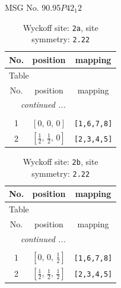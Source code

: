 \documentclass[fleqn,8pt]{jsarticle}
\begin{document}
\setcounter{MaxMatrixCols}{32}

\renewcommand{\tablename}{Table~}
\renewcommand{\figurename}{Figure~}
\begin{center}
\LARGE
MSG No. 90.95\quad$P42_{1}2$
\end{center}
\renewcommand{\arraystretch}{1.2}
\begin{longtable}{ccc}
\caption{Wyckoff site: {\tt 2a}, site symmetry: {\tt 2.22}}
 \\
 \hline \hline
No. & position & mapping \\ \hline \endfirsthead

\multicolumn{2}{l}{\tablename\ \thetable{}} \\
 \hline \hline
No. & position & mapping \\ \hline \endhead

 \hline \hline
\multicolumn{2}{r}{\footnotesize\it continued ...} \\ \endfoot

 \hline \hline
\multicolumn{2}{r}{} \\ \endlastfoot

1 & $\left[ 0,\, 0,\, 0 \right]$ & {\tt [1,6,7,8]} \\ \hline
2 & $\left[ \frac{1}{2},\, \frac{1}{2},\, 0 \right]$ & {\tt [2,3,4,5]} \\
\end{longtable}
\renewcommand{\arraystretch}{1.2}
\begin{longtable}{ccc}
\caption{Wyckoff site: {\tt 2b}, site symmetry: {\tt 2.22}}
 \\
 \hline \hline
No. & position & mapping \\ \hline \endfirsthead

\multicolumn{2}{l}{\tablename\ \thetable{}} \\
 \hline \hline
No. & position & mapping \\ \hline \endhead

 \hline \hline
\multicolumn{2}{r}{\footnotesize\it continued ...} \\ \endfoot

 \hline \hline
\multicolumn{2}{r}{} \\ \endlastfoot

1 & $\left[ 0,\, 0,\, \frac{1}{2} \right]$ & {\tt [1,6,7,8]} \\ \hline
2 & $\left[ \frac{1}{2},\, \frac{1}{2},\, \frac{1}{2} \right]$ & {\tt [2,3,4,5]} \\
\end{longtable}
\end{document}
